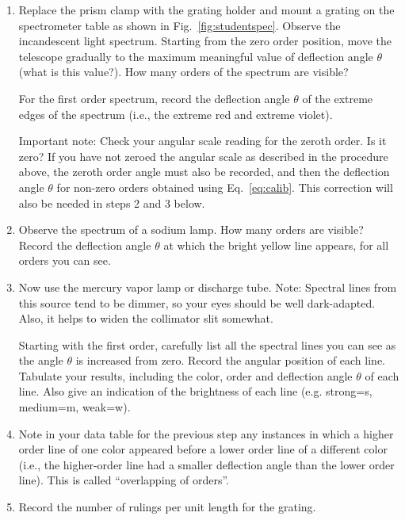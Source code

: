 \begin{enumerate}
\item Replace the prism clamp with the grating holder and mount a grating
on the spectrometer table as shown in Fig.~\ref{fig:studentspec}.  Observe the
incandescent light spectrum.  Starting from the zero order position,
move the telescope gradually to the maximum meaningful value of
deflection angle ${\theta}$ (what is this value?).  How many orders of
the spectrum are visible? 

For the first order spectrum, record the deflection angle ${\theta}$ of
the extreme edges of the spectrum (i.e., the extreme red and extreme
violet).

Important note: Check your angular scale reading for the zeroth order.
 Is it zero?  If you have not zeroed the angular scale as described
in the procedure above, the zeroth order angle must also be recorded,
and then the deflection angle ${\theta}$  for non-zero orders obtained
using Eq.~\ref{eq:calib}. This correction will also be needed in steps 2 and 3
below.

\item Observe the spectrum of a sodium lamp.  How many orders are
visible? Record the deflection angle ${\theta}$ at which the bright
yellow line appears, for all orders you can see.

\item Now use the mercury vapor lamp or discharge tube.  Note: Spectral
lines from this source tend to be dimmer, so your eyes should be well
dark-adapted.  Also, it helps to widen the collimator slit somewhat.

Starting with the first order, carefully list all the spectral lines you
can see as the angle ${\theta}$ is increased from zero.  Record the
angular position of each line. Tabulate your results, including the
color, order and deflection angle ${\theta}$ of each line.  Also give
an indication of the brightness of each line (e.g. strong=s, medium=m,
weak=w). 

\item Note in your data table for the previous step any instances in
which a higher order line of one color appeared before a lower order
line of a different color (i.e., the higher-order line had a smaller
deflection angle  than the lower order line).  This is called
``overlapping of orders''.

\item Record the number of rulings per unit length for the grating.
\end{enumerate}

